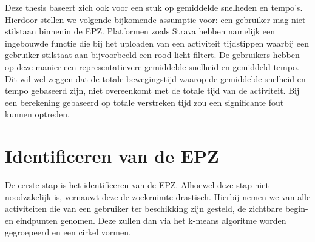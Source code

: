 Deze thesis baseert zich ook voor een stuk op gemiddelde snelheden en tempo's.
Hierdoor stellen we volgende bijkomende assumptie voor: een gebruiker mag niet
stilstaan binnenin de \ac{EPZ}. Platformen zoals Strava hebben namelijk een
ingebouwde functie die bij het uploaden van een activiteit tijdstippen waarbij
een gebruiker stilstaat aan bijvoorbeeld een rood licht filtert. De gebruikers
hebben op deze manier een representatievere gemiddelde snelheid en gemiddeld
tempo. Dit wil wel zeggen dat de totale bewegingstijd waarop de gemiddelde
snelheid en tempo gebaseerd zijn, niet overeenkomt met de totale tijd van de
activiteit. Bij een berekening gebaseerd op totale verstreken tijd zou een
significante fout kunnen optreden.

\section{Identificeren van de EPZ}
De eerste stap is het identificeren van de \ac{EPZ}. Alhoewel deze stap niet
noodzakelijk is, vernauwt deze de zoekruimte drastisch. Hierbij nemen we van
alle activiteiten die van een gebruiker ter beschikking zijn gesteld, de
zichtbare begin- en eindpunten genomen. Deze zullen dan via het k-means
algoritme worden gegroepeerd en een cirkel vormen.

